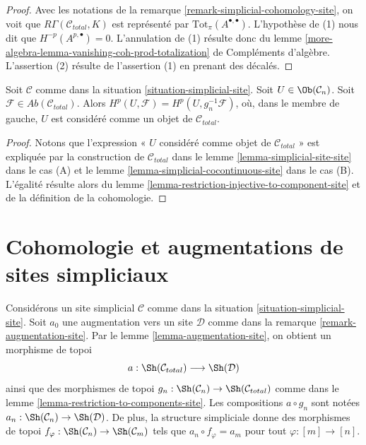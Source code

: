 \begin{proof}
Avec les notations de la remarque \ref{remark-simplicial-cohomology-site},
on voit que $R\Gamma(\mathcal{C}_{total}, K)$ est
représenté par $\text{Tot}_\pi(A^{\bullet, \bullet})$.
L'hypothèse de (1) nous dit que $H^{-p}(A^{p, \bullet}) = 0$.
L'annulation de (1) résulte donc du
lemme \ref{more-algebra-lemma-vanishing-coh-prod-totalization} de Compléments d'algèbre.
L'assertion (2) résulte de l'assertion (1) en prenant des décalés.
\end{proof}

\begin{lemma}
\label{lemma-sanity-check}
Soit $\mathcal{C}$ comme dans la situation \ref{situation-simplicial-site}.
Soit $U \in \Ob(\mathcal{C}_n)$. Soit
$\mathcal{F} \in \textit{Ab}(\mathcal{C}_{total})$.
Alors $H^p(U, \mathcal{F}) = H^p(U, g_n^{-1}\mathcal{F})$,
où, dans le membre de gauche, $U$ est considéré comme un objet de $\mathcal{C}_{total}$.
\end{lemma}

\begin{proof}
Notons que l'expression « $U$ considéré comme objet de $\mathcal{C}_{total}$ »
est expliquée par la construction de $\mathcal{C}_{total}$ dans le
lemme \ref{lemma-simplicial-site-site} dans le cas (A) et le
lemme \ref{lemma-simplicial-cocontinuous-site} dans le cas (B).
L'égalité résulte alors du
lemme \ref{lemma-restriction-injective-to-component-site}
et de la définition de la cohomologie.
\end{proof}






\section{Cohomologie et augmentations de sites simpliciaux}
\label{section-cohomology-augmentation-simplicial-sites}

\noindent
Considérons un site simplicial $\mathcal{C}$ comme dans la situation
\ref{situation-simplicial-site}.
Soit $a_0$ une augmentation vers un site $\mathcal{D}$ comme dans la
remarque \ref{remark-augmentation-site}.
Par le lemme \ref{lemma-augmentation-site}, on obtient un morphisme de topoi
$$
a : \Sh(\mathcal{C}_{total}) \longrightarrow \Sh(\mathcal{D})
$$
ainsi que des morphismes de topoi
$g_n : \Sh(\mathcal{C}_n) \to \Sh(\mathcal{C}_{total})$
comme dans le lemme \ref{lemma-restriction-to-components-site}.
Les compositions $a \circ g_n$ sont notées
$a_n : \Sh(\mathcal{C}_n) \to \Sh(\mathcal{D})$.
De plus, la structure simpliciale donne des morphismes
de topoi
$f_\varphi : \Sh(\mathcal{C}_n) \to \Sh(\mathcal{C}_m)$
tels que $a_n \circ f_\varphi = a_m$ pour tout $\varphi : [m] \to [n]$.

